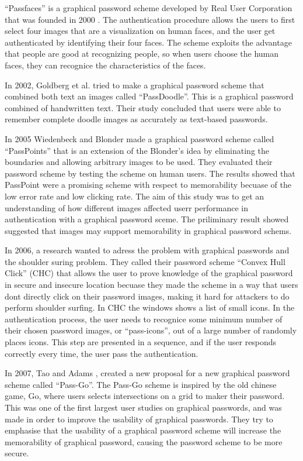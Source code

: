  ``Passfaces'' is a graphical password scheme developed by Real User Corporation that was founded in 2000 \cite{passface}. The authentication procedure allows the users to first select four images that are a visualization on human faces, and the user get authenticated by identifying their four faces. The scheme exploits the advantage that people are good at recognizing people, so when users choose the human faces, they can recognice the characteristics of the faces.

  In 2002, Goldberg et al. \cite{PassDoodle} tried to make a graphical password scheme that combined both text an images called ``PassDoodle''. This is a graphical password combined of handwritten text. Their study concluded that users were able to remember complete doodle images as accurately as text-based passwords. 

  In 2005 Wiedenbeck and Blonder made a graphical password scheme called ``PassPoints'' \cite{PassPoints} that is an  extension of the Blonder's \cite{Blonder} idea by eliminating the boundaries and allowing arbitrary images to be used. They evaluated their password scheme by testing the scheme on human users. The results showed that PassPoint were a promising scheme with respect to memorability becuase of the low error rate and low clicking rate. 
  The aim of this study was to get an understanding of how different images affected userr performance in authentication with a graphical password sceme. The priliminary result showed suggested that images may support memorability in graphical password schems. 

  In 2006, a research wanted to adress the problem with graphical passwords and the shoulder suring problem. They called their password scheme ``Convex Hull Click'' (CHC) \cite{Wiedenbeck} that allows the user to prove knowledge of the graphical password in secure and insecure location becuase they made the scheme in a way that users dont directly click on their password images, making it hard for attackers to do perform shoulder surfing. In CHC the windows shows a list of small icons. In the authentication process, the user needs to recognice some minimum number of their chosen password images, or ``pass-icons'', out of a large number of randomly places icons. This step are presented in a sequence, and if the user responds correctly every time, the user pass the authentication.
  
  In 2007, Tao and Adams \cite{Tao}, created a new proposal for a new graphical password scheme called ``Pass-Go''. The Pass-Go scheme is inspired by the old chinese game, Go, where users selects intersections on a grid to maker their password. This was one of the first largest user studies on graphical passwords, and was made in order to improve the usability of graphical passwords. They try to emphasise that the usability of a graphical password scheme will increase the memorability of graphical password, causing the password scheme to be more secure.  
 
